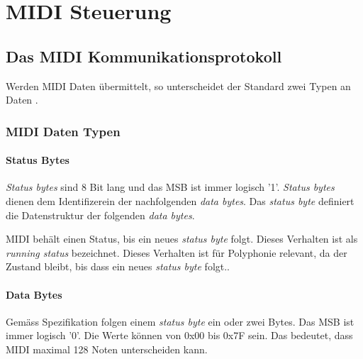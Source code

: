 
\chapter{MIDI Steuerung}\label{chap.midi}

\section{Das MIDI Kommunikationsprotokoll}\label{sect.midi_spezification}

Werden MIDI Daten übermittelt, so unterscheidet der Standard zwei Typen an Daten \cite{Midi_specification}.

\subsection{MIDI Daten Typen}\label{datenytpen}

\subsubsection*{Status Bytes}

\textit{Status bytes} sind 8 Bit lang und das MSB ist immer logisch '1'.  \textit{Status bytes} dienen dem Identifizerein der nachfolgenden \textit{data bytes}. Das \textit{status byte} definiert die Datenstruktur der folgenden \textit{data bytes}.

MIDI behält einen Status, bis ein neues \textit{status byte} folgt. Dieses Verhalten ist als \textit{running status} bezeichnet. Dieses Verhalten ist für Polyphonie relevant, da der Zustand bleibt, bis dass ein neues \textit{status byte} folgt..

\subsubsection*{Data Bytes}

Gemäss Spezifikation folgen einem \textit{status byte} ein oder zwei Bytes. Das MSB ist immer logisch '0'. Die Werte können von 0x00 bis 0x7F sein. Das bedeutet, dass MIDI maximal 128 Noten unterscheiden kann.

